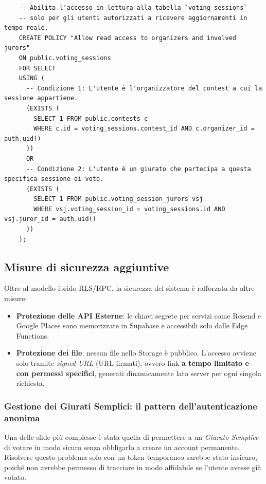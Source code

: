\begin{longlisting}
    \begin{verbatim}
    -- Abilita l'accesso in lettura alla tabella `voting_sessions`
    -- solo per gli utenti autorizzati a ricevere aggiornamenti in tempo reale.
    CREATE POLICY "Allow read access to organizers and involved jurors"
    ON public.voting_sessions
    FOR SELECT
    USING (
      -- Condizione 1: L'utente è l'organizzatore del contest a cui la sessione appartiene.
      (EXISTS (
        SELECT 1 FROM public.contests c
        WHERE c.id = voting_sessions.contest_id AND c.organizer_id = auth.uid()
      ))
      OR
      -- Condizione 2: L'utente è un giurato che partecipa a questa specifica sessione di voto.
      (EXISTS (
        SELECT 1 FROM public.voting_session_jurors vsj
        WHERE vsj.voting_session_id = voting_sessions.id AND vsj.juror_id = auth.uid()
      ))
    );
    \end{verbatim}
    \caption{Policy RLS di tipo SELECT per la tabella ``voting\_sessions'', necessaria per il servizio Realtime.}
    \label{lst:rls_realtime_policy}
\end{longlisting}

\subsection{Misure di sicurezza aggiuntive}\label{subsec:misure-di-sicurezza-aggiuntive}
Oltre al modello ibrido RLS/RPC, la sicurezza del sistema è rafforzata da altre misure:
\begin{itemize}
    \item \textbf{Protezione delle API Esterne}: le chiavi segrete per servizi come Resend e Google Places sono memorizzate in Supabase e accessibili solo dalle Edge Functions.
    \item \textbf{Protezione dei file}: nessun file nello Storage è pubblico.
    L'accesso avviene solo tramite \emph{signed URL} (URL firmati), ovvero link \textbf{a tempo limitato e con permessi specifici}, generati dinamicamente lato server per ogni singola richiesta.
\end{itemize}

\subsubsection{Gestione dei Giurati Semplici: il pattern dell'autenticazione anonima}
Una delle sfide più complesse è stata quella di permettere a un \emph{Giurato Semplice} di votare in modo sicuro senza obbligarlo a creare un account permanente.
Risolvere questo problema solo con un token temporaneo sarebbe stato insicuro, poiché non avrebbe permesso di tracciare in modo affidabile se l'utente avesse già votato.

